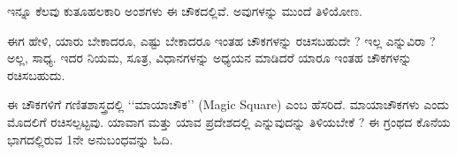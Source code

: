 ಇನ್ನೂ ಕೆಲವು ಕುತೂಹಲಕಾರಿ ಅಂಶಗಳು ಈ ಚೌಕದಲ್ಲಿವೆ. ಅವುಗಳನ್ನು ಮುಂದೆ ತಿಳಿಯೋಣ.

ಈಗ ಹೇಳಿ, ಯಾರು ಬೇಕಾದರೂ, ಎಷ್ಟು ಬೇಕಾದರೂ ಇಂತಹ ಚೌಕಗಳನ್ನು ರಚಿಸ\-ಬಹುದೇ ? ಇಲ್ಲ ಎನ್ನುವಿರಾ ? ಅಲ್ಲ, ಸಾಧ್ಯ. ಇದರ ನಿಯಮ, ಸೂತ್ರ, ವಿಧಾನಗಳನ್ನು ಅಧ್ಯಯನ ಮಾಡಿದರೆ ಯಾರೂ ಇಂತಹ ಚೌಕಗಳನ್ನು ರಚಿಸಬಹುದು.

ಈ ಚೌಕಗಳಿಗೆ ಗಣಿತಶಾಸ್ತ್ರದಲ್ಲಿ ‘‘ಮಾಯಾಚೌಕ’’ (Magic Square) ಎಂಬ ಹೆಸರಿದೆ. ಮಾಯಾಚೌಕಗಳು ಎಂದು ಮೊದಲಿಗೆ ರಚಿಸಲ್ಪಟ್ಟವು. ಯಾವಾಗ ಮತ್ತು ಯಾವ ಪ್ರದೇಶದಲ್ಲಿ ಎನ್ನುವುದನ್ನು ತಿಳಿಯಬೇಕೆ ? ಈ ಗ್ರಂಥದ ಕೊನೆಯ ಭಾಗದಲ್ಲಿರುವ 1ನೇ ಅನುಬಂಧವನ್ನು ಓದಿ.
